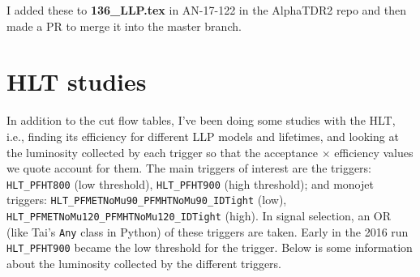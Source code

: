 I added these to \textbf{136\_LLP.tex} in AN-17-122 in the AlphaTDR2 repo and then made a PR to merge it into the master branch.


\section{HLT studies}

In addition to the cut flow tables, I've been doing some studies with the HLT, i.e., finding its efficiency for different LLP models and lifetimes, and looking at the luminosity collected by each trigger so that the acceptance $\times$ efficiency values we quote account for them. The main triggers of interest are the \HT triggers: \texttt{HLT\_PFHT800} (low threshold), \texttt{HLT\_PFHT900} (high threshold); and monojet triggers: \texttt{HLT\_PFMETNoMu90\_PFMHTNoMu90\_IDTight} (low),  \texttt{HLT\_PFMETNoMu120\_PFMHTNoMu120\_IDTight} (high). In signal selection, an OR (like Tai's \texttt{Any} class in Python) of these triggers are taken. Early in the 2016 run \texttt{HLT\_PFHT900} became the low threshold for the \HT trigger. Below is some information about the luminosity collected by the different triggers.

\begin{table}[htbp]
\caption{The luminosity collected by each HLT, or combination of Triggers, from the entire 2016 run. Over the course of the run, the threshold for the lowest unprescaled trigger in each category rose. The fraction of luminosity collected by each Trigger whilst it was lowest threshold is included.}
\end{table}


